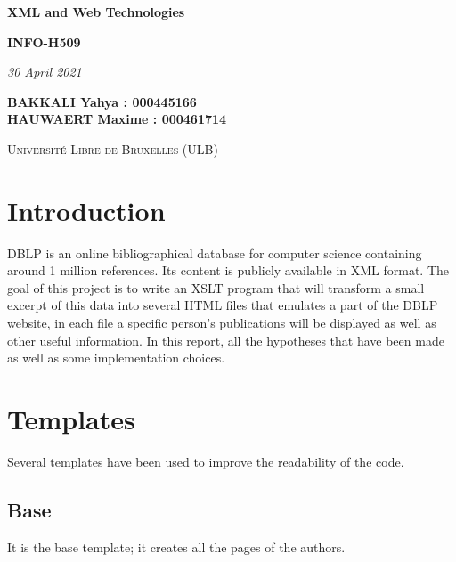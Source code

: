 \documentclass{article}[a4]
\begin{document}
\begin{titlepage}
    \begin{center}
        \vspace*{1cm}

        \Huge
        \textbf{XML and Web Technologies}
        \vspace{0.25cm}

        \LARGE
        \textbf{INFO-H509}

        \vspace{0.25cm}
        \LARGE

        \vspace{0.25cm}
        \textit{30 April 2021}

        \vspace{3cm}
           \Large
        \textbf{BAKKALI Yahya : 000445166 \\}
        \textbf{HAUWAERT Maxime : 000461714 \\}

        \vspace{2cm}

        \textsc{Université Libre de Bruxelles (ULB)}


    \end{center}
\end{titlepage}

\tableofcontents
\newpage

\section{Introduction} %

DBLP is an online bibliographical database for computer science containing around 1 million references. Its content is publicly available in XML format. The goal of this project is to write an XSLT program that will transform a small excerpt of this data into several HTML files that emulates a part of the DBLP website, in each file a specific person's publications will be displayed as well as other useful information. In this report, all the hypotheses that have been made as well as some implementation choices.

\section{Templates}
Several templates have been used to improve the readability of the code.

\subsection{Base}
It is the base template; it creates all the pages of the authors.
\end{document}
